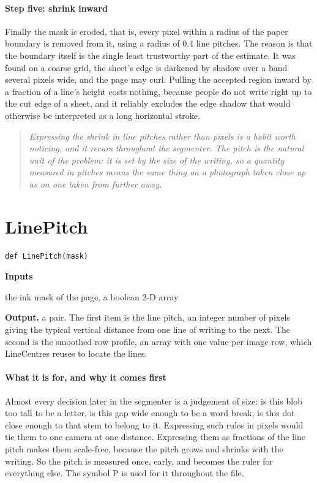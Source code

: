 \paragraph{Step five: shrink inward}
Finally the mask is eroded, that is, every pixel within a radius of the paper boundary is removed from it, using a radius of 0.4 line pitches. The reason is that the boundary itself is the single least trustworthy part of the estimate. It was found on a coarse grid, the sheet's edge is darkened by shadow over a band several pixels wide, and the page may curl. Pulling the accepted region inward by a fraction of a line's height costs nothing, because people do not write right up to the cut edge of a sheet, and it reliably excludes the edge shadow that would otherwise be interpreted as a long horizontal stroke.


\begin{quote}\small\itshape Expressing the shrink in line pitches rather than pixels is a habit worth noticing, and it recurs throughout the segmenter. The pitch is the natural unit of the problem: it is set by the size of the writing, so a quantity measured in pitches means the same thing on a photograph taken close up as on one taken from further away.\end{quote}

\section{LinePitch}
\begin{lstlisting}[style=sig]
def LinePitch(mask)
\end{lstlisting}

\noindent\textbf{Inputs}
\begin{description}[leftmargin=2.2em,style=nextline,font=\normalfont\ttfamily]\setlength\itemsep{1pt}
  \item[{mask}] \normalfont the ink mask of the page, a boolean 2-D array
\end{description}

\noindent\textbf{Output.} a pair. The first item is the line pitch, an integer number of pixels giving the typical vertical distance from one line of writing to the next. The second is the smoothed row profile, an array with one value per image row, which LineCentres reuses to locate the lines.


\paragraph{What it is for, and why it comes first}
Almost every decision later in the segmenter is a judgement of size: is this blob too tall to be a letter, is this gap wide enough to be a word break, is this dot close enough to that stem to belong to it. Expressing such rules in pixels would tie them to one camera at one distance. Expressing them as fractions of the line pitch makes them scale-free, because the pitch grows and shrinks with the writing. So the pitch is measured once, early, and becomes the ruler for everything else. The symbol P is used for it throughout the file.


